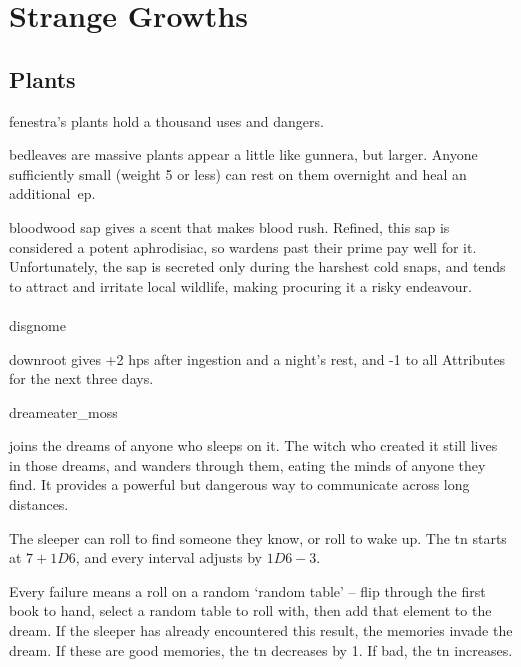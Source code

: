 \chapter{Strange Growths}
\label{growths}

\section[Plants]{Plants~}
\label{plants}

\begin{multicols}{2}
\renewcommand\npcsymbol{\glsentrysymbol{plant}}

\noindent
\Gls{fenestra}'s plants hold a thousand uses and dangers.

%
  {bedleaves}%
  {are massive plants appear a little like gunnera, but larger.
  Anyone sufficiently small (\gls{weight} 5 or less) can rest on them overnight and heal an additional~\gls{ep}.}%

%
  {bloodwood}%
  {sap gives a scent that makes blood rush.
  Refined, this sap is considered a potent aphrodisiac, so \glspl{warden} past their prime pay well for it.
  Unfortunately, the sap is secreted only during the harshest cold snaps, 
  and tends to attract and irritate local wildlife, making procuring it a risky endeavour.
  }

\subsubsection{}
\glsdesc{disgnome}

%
  {downroot}%
  {gives +2 \glspl{hp} after ingestion and a night's rest, and -1 to all Attributes for the next three days.
  }

%
  {dreameater_moss}%
  {joins the dreams of anyone who sleeps on it.
    The \gls{witch} who created it still lives in those dreams, and wanders through them, eating the minds of anyone they find.
    It provides a powerful but dangerous way to communicate across long distances.

    The sleeper can roll  to find someone they know, or roll  to wake up.
    The \gls{tn} starts at $7 + 1D6$, and every \gls{interval} adjusts by $1D6 - 3$.

    Every failure means a roll on a random `random table' -- flip through the first book to hand, select a random table to roll with, then add that element to the dream.
    If the sleeper has already encountered this result, the memories invade the dream.
    If these are good memories, the \gls{tn} decreases by 1.
    If bad, the \gls{tn} increases.
  }


\end{multicols}
